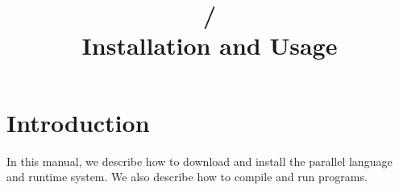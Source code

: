 \documentclass[10pt]{article}
\title{\charmpp{}/\converse{}\\Installation and Usage}
\begin{document}
\maketitle

\section{Introduction}
In this manual, we describe how to download and install the \charmpp{} 
parallel language and runtime system.  We also describe how to compile
and run \charmpp{} programs.


%
%
\end{document}
